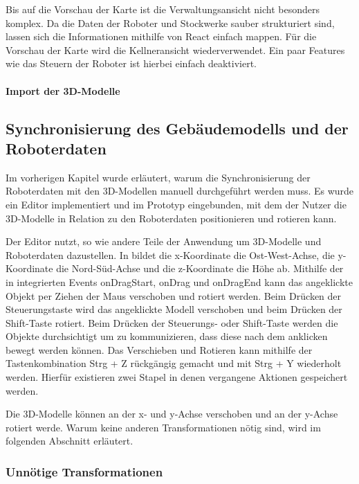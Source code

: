 Bis auf die Vorschau der Karte ist die Verwaltungsansicht nicht besonders komplex. Da die Daten der Roboter und Stockwerke sauber strukturiert sind, lassen sich die Informationen mithilfe von React einfach mappen. Für die Vorschau der Karte wird die Kellneransicht wiederverwendet. Ein paar Features wie das Steuern der Roboter ist hierbei einfach deaktiviert.

\paragraph{Import der 3D-Modelle}

\subsection{Synchronisierung des Gebäudemodells und der Roboterdaten}
Im vorherigen Kapitel wurde erläutert, warum die Synchronisierung der Roboterdaten mit den 3D-Modellen manuell durchgeführt werden muss. Es wurde ein Editor implementiert und im Prototyp eingebunden, mit dem der Nutzer die 3D-Modelle in Relation zu den Roboterdaten positionieren und rotieren kann.

Der Editor nutzt, so wie andere Teile der Anwendung \deckgl{} um 3D-Modelle und Roboterdaten dazustellen. In \deckgl{} bildet die x-Koordinate die Ost-West-Achse, die y-Koordinate die Nord-Süd-Achse und die z-Koordinate die Höhe ab. Mithilfe der in \deckgl{} integrierten Events onDragStart, onDrag und onDragEnd kann das angeklickte Objekt per Ziehen der Maus verschoben und rotiert werden. Beim Drücken der Steuerungstaste wird das angeklickte Modell verschoben und beim Drücken der Shift-Taste rotiert. Beim Drücken der Steuerungs- oder Shift-Taste werden die Objekte durchsichtigt um zu kommunizieren, dass diese nach dem anklicken bewegt werden können. Das Verschieben und Rotieren kann mithilfe der Tastenkombination Strg + Z rückgängig gemacht und mit Strg + Y wiederholt werden. Hierfür existieren zwei Stapel in denen vergangene Aktionen gespeichert werden.

Die 3D-Modelle können an der x- und y-Achse verschoben und an der y-Achse rotiert werde. Warum keine anderen Transformationen nötig sind, wird im folgenden Abschnitt erläutert.

\subsubsection{Unnötige Transformationen}

